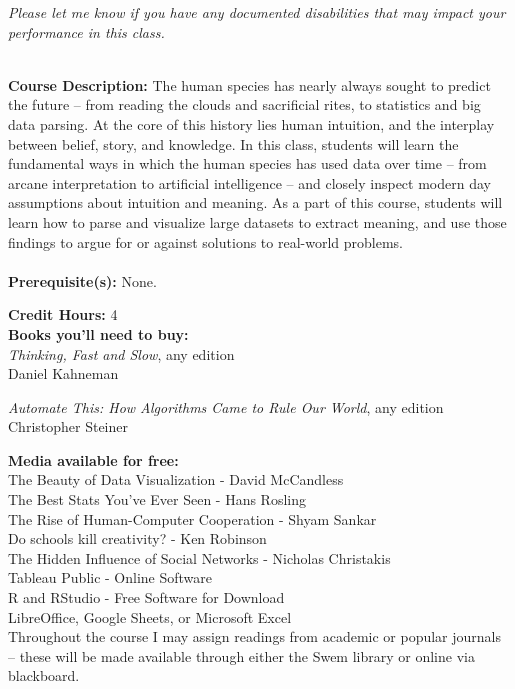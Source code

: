 \documentclass[11pt]{article}
\begin{document}
\textit{Please let me know if you have any documented disabilities that may impact your performance in this class.}

\textbf {\large \\ Course Description:} The human species has nearly always sought to predict the future – from reading the clouds and sacrificial rites, to statistics and big data parsing. At the core of this history lies human intuition, and the interplay between belief, story, and knowledge. In this class, students will learn the fundamental ways in which the human species has used data over time – from arcane interpretation to artificial intelligence – and closely inspect modern day assumptions about intuition and meaning. As a part of this course, students will learn how to parse and visualize large datasets to extract meaning, and use those findings to argue for or against solutions to real-world problems. \\
\\
\textbf {Prerequisite(s):} None.

\textbf {Credit Hours:} 4 \\

\textbf {\large Books you'll need to buy:}\\ \emph{Thinking, Fast and Slow}, any edition \\
Daniel Kahneman 
\vspace{2mm}

\emph{Automate This: How Algorithms Came to Rule Our World}, any edition \\
Christopher Steiner
\vspace{2mm}

\textbf {\large Media available for free:}\\

The Beauty of Data Visualization - David McCandless \\
The Best Stats You’ve Ever Seen - Hans Rosling \\
The Rise of Human-Computer Cooperation - Shyam Sankar\\
Do schools kill creativity? - Ken Robinson \\
The Hidden Influence of Social Networks - Nicholas Christakis\\
Tableau Public - Online Software\\
R and RStudio - Free Software for Download\\
LibreOffice, Google Sheets, or Microsoft Excel\\

Throughout the course I may assign readings from academic or popular journals – these will be made available through either the Swem library or online via blackboard.
\end{document}
